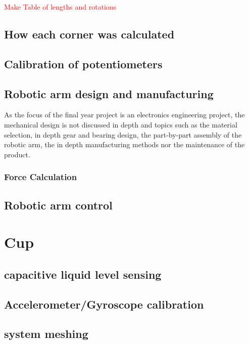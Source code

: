 \documentclass{article}
\newcommand{\rf}[1]{\textcolor{red}{#1}}
\begin{document}
\rf{Make Table of lengths and rotations}


\subsection{How each corner was calculated}
\subsection{Calibration of potentiometers}
\subsection{Robotic arm design and manufacturing} \label{sec:rba:mech}

As the focus of the final year project is an electronics engineering project, the mechanical design is not discussed in depth and topics such as the material selection, in depth gear and bearing design, the part-by-part assembly of the robotic arm, the in depth manufacturing methods nor the maintenance of the product.

\subsubsection{Force Calculation}



\subsection{Robotic arm control}

\section{Cup}
\subsection{capacitive liquid level sensing}
\subsection{Accelerometer/Gyroscope calibration}
\subsection{system meshing}
\end{document}
